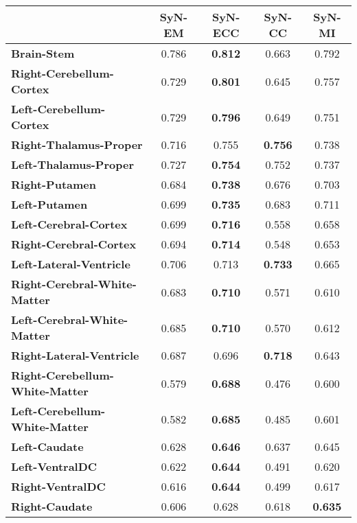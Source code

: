 \begin{table}[htbp]
\begin{adjustwidth}{-0.75cm}{}
  \centering
  {\small
    \begin{tabular}{lcccc}
    \toprule
          & \textbf{SyN-EM} & \textbf{SyN-ECC} & \textbf{SyN-CC} & \textbf{SyN-MI} \\
    \midrule
    \textbf{Brain-Stem} & 0.786 & \textbf{0.812} & 0.663 & 0.792 \\
    \textbf{Right-Cerebellum-Cortex} & 0.729 & \textbf{0.801} & 0.645 & 0.757 \\
    \textbf{Left-Cerebellum-Cortex} & 0.729 & \textbf{0.796} & 0.649 & 0.751 \\
    \textbf{Right-Thalamus-Proper} & 0.716 & 0.755 & \textbf{0.756} & 0.738 \\
    \textbf{Left-Thalamus-Proper} & 0.727 & \textbf{0.754} & 0.752 & 0.737 \\
    \textbf{Right-Putamen} & 0.684 & \textbf{0.738} & 0.676 & 0.703 \\
    \textbf{Left-Putamen} & 0.699 & \textbf{0.735} & 0.683 & 0.711 \\
    \textbf{Left-Cerebral-Cortex} & 0.699 & \textbf{0.716} & 0.558 & 0.658 \\
    \textbf{Right-Cerebral-Cortex} & 0.694 & \textbf{0.714} & 0.548 & 0.653 \\
    \textbf{Left-Lateral-Ventricle} & 0.706 & 0.713 & \textbf{0.733} & 0.665 \\
    \textbf{Right-Cerebral-White-Matter} & 0.683 & \textbf{0.710} & 0.571 & 0.610 \\
    \textbf{Left-Cerebral-White-Matter} & 0.685 & \textbf{0.710} & 0.570 & 0.612 \\
    \textbf{Right-Lateral-Ventricle} & 0.687 & 0.696 & \textbf{0.718} & 0.643 \\
    \textbf{Right-Cerebellum-White-Matter} & 0.579 & \textbf{0.688} & 0.476 & 0.600 \\
    \textbf{Left-Cerebellum-White-Matter} & 0.582 & \textbf{0.685} & 0.485 & 0.601 \\
    \textbf{Left-Caudate} & 0.628 & \textbf{0.646} & 0.637 & 0.645 \\
    \textbf{Left-VentralDC} & 0.622 & \textbf{0.644} & 0.491 & 0.620 \\
    \textbf{Right-VentralDC} & 0.616 & \textbf{0.644} & 0.499 & 0.617 \\
    \textbf{Right-Caudate} & 0.606 & 0.628 & 0.618 & \textbf{0.635} \\

\end{tabular}}
\end{adjustwidth}
\end{table}
